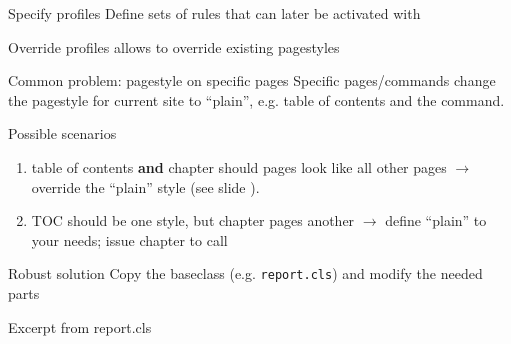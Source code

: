 \begin{frame}
	\begin{block}{Specify profiles}
		Define sets of rules that can later be activated with 
	\end{block}
\end{frame}
\begin{frame}
	\begin{block}{Override profiles}
		 allows to override  existing pagestyles
	\end{block}
\end{frame}
\begin{frame}
	\begin{block}{Common problem: pagestyle on specific pages}
		Specific pages/commands change the pagestyle for current site to
		``plain'', e.g. table of contents and the  command.
	\end{block}

	\begin{block}{Possible scenarios}
		\begin{enumerate}
			\item table of contents \textbf{and} chapter should pages look
			like all other pages $\rightarrow$ override the ``plain'' style (see
			slide \pageref{codex:fancyhdr-profile-override}).
		\item TOC should be one style, but chapter pages another $\rightarrow$
			define ``plain'' to your needs; issue chapter to call
		\end{enumerate}
	\end{block}
\end{frame}
\begin{frame}
\end{frame}
\begin{frame}
	\begin{block}{Robust solution}
		Copy the baseclass (e.g. \texttt{report.cls}) and modify the needed
		parts
	\end{block}
	\begin{codeblock}{Excerpt from report.cls}
		
	\end{codeblock}
\end{frame}

